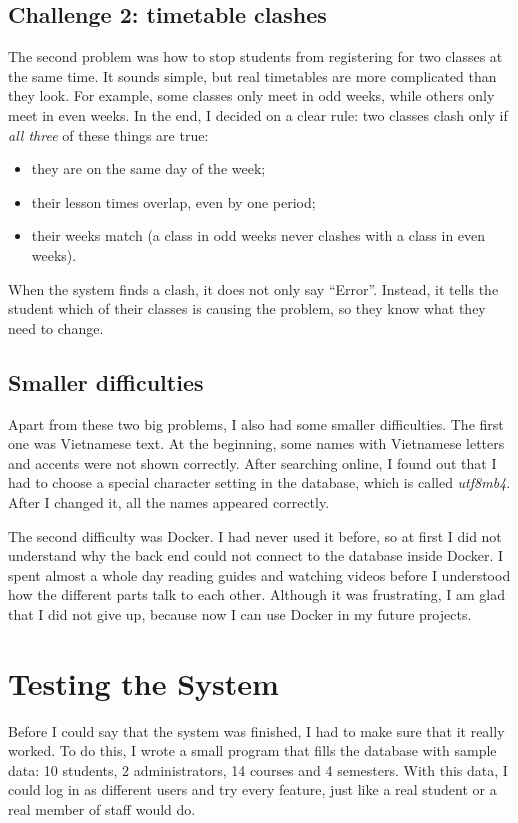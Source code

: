 \documentclass[12pt,a4paper]{article}
\begin{document}
\subsection{Challenge 2: timetable clashes}
The second problem was how to stop students from registering for two classes
at the same time. It sounds simple, but real timetables are more complicated
than they look. For example, some classes only meet in odd weeks, while others
only meet in even weeks. In the end, I decided on a clear rule: two classes
clash only if \emph{all three} of these things are true:
\begin{itemize}[leftmargin=1.6em]
  \item they are on the same day of the week;
  \item their lesson times overlap, even by one period;
  \item their weeks match (a class in odd weeks never clashes with a class in
        even weeks).
\end{itemize}
When the system finds a clash, it does not only say ``Error''. Instead, it
tells the student which of their classes is causing the problem, so they know
what they need to change.

\subsection{Smaller difficulties}
Apart from these two big problems, I also had some smaller difficulties. The
first one was Vietnamese text. At the beginning, some names with Vietnamese
letters and accents were not shown correctly. After
searching online, I found out that I had to choose a special character setting
in the database, which is called \emph{utf8mb4}. After I changed it, all the
names appeared correctly.

The second difficulty was Docker. I had never used it before, so at first I
did not understand why the back end could not connect to the database inside
Docker. I spent almost a whole day reading guides and watching videos before I
understood how the different parts talk to each other. Although it was
frustrating, I am glad that I did not give up, because now I can use Docker in
my future projects.

\section{Testing the System}

Before I could say that the system was finished, I had to make sure that it
really worked. To do this, I wrote a small program that fills the database with
sample data: 10 students, 2 administrators, 14 courses and 4 semesters. With
this data, I could log in as different users and try every feature, just like
a real student or a real member of staff would do.
\end{document}
